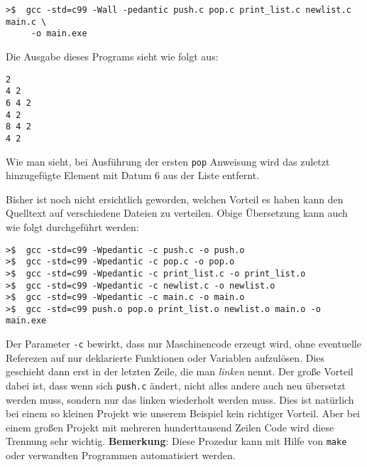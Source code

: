 \vspace*{0.5cm}
\begin{verbatim}
>$  gcc -std=c99 -Wall -pedantic push.c pop.c print_list.c newlist.c main.c \
     -o main.exe
\end{verbatim}
\vspace*{0.5cm}

\noindent Die Ausgabe dieses Programs sieht wie folgt aus:
\begin{verbatim}
2	
4 2
6 4 2	
4 2
8 4 2	
4 2
\end{verbatim}
Wie man sieht, bei Ausführung der ersten \texttt{pop} Anweisung wird das zuletzt hinzugefügte Element mit Datum $6$ aus der Liste entfernt.

Bisher ist noch nicht ersichtlich geworden, welchen Vorteil es haben kann den Quelltext auf verschiedene Dateien zu verteilen.
Obige Übersetzung kann auch wie folgt durchgeführt werden:

\vspace*{0.5cm}
\begin{verbatim}
>$  gcc -std=c99 -Wpedantic -c push.c -o push.o
>$  gcc -std=c99 -Wpedantic -c pop.c -o pop.o
>$  gcc -std=c99 -Wpedantic -c print_list.c -o print_list.o
>$  gcc -std=c99 -Wpedantic -c newlist.c -o newlist.o
>$  gcc -std=c99 -Wpedantic -c main.c -o main.o
>$  gcc -std=c99 push.o pop.o print_list.o newlist.o main.o -o main.exe
\end{verbatim}
\vspace*{0.5cm}

Der Parameter \texttt{-c} bewirkt, dass nur Maschinencode erzeugt wird, ohne eventuelle Referezen auf nur deklarierte Funktionen oder Variablen aufzulösen.
Dies geschieht dann erst in der letzten Zeile, die man \emph{linken} nennt.
Der große Vorteil dabei ist, dass wenn sich \texttt{push.c} ändert, nicht alles andere auch neu übersetzt werden muss, sondern nur das linken wiederholt werden muss.
Dies ist natürlich bei einem so kleinen Projekt wie unserem Beispiel kein richtiger Vorteil.
Aber bei einem großen Projekt mit mehreren hunderttausend Zeilen Code wird diese Trennung sehr wichtig.
\textbf{Bemerkung}: Diese Prozedur kann mit Hilfe von \texttt{make} oder verwandten Programmen automatisiert werden.
\endinput

